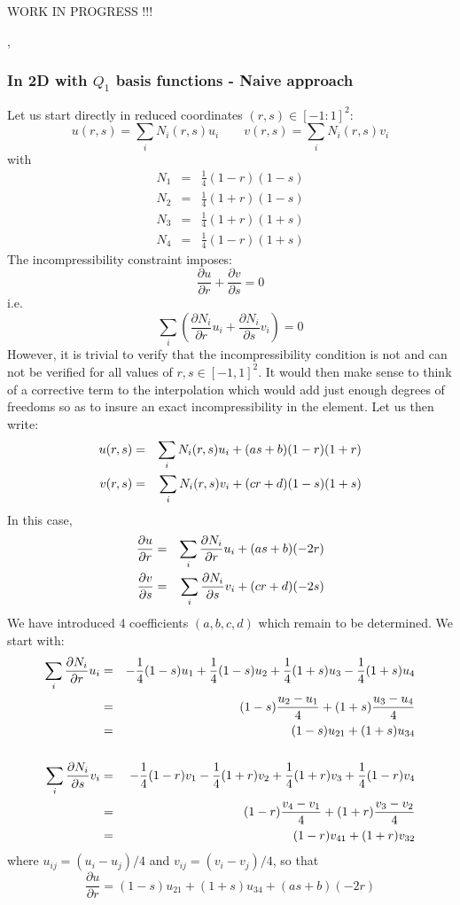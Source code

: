 
WORK IN PROGRESS !!!


\Literature \cite{pukp16},\cite{mcna11} \cite{waav15}

\subsubsection{In 2D with $Q_1$ basis functions - Naive approach}

Let us start directly in reduced coordinates $(r,s)\in [-1:1]^2$:
\[
u(r,s)=\sum_i N_i(r,s) u_i
\quad
\quad
v(r,s)=\sum_i N_i(r,s) v_i
\]
with 
\begin{eqnarray}
N_1&=& \frac{1}{4}(1-r)(1-s)  \nonumber\\ 
N_2&=& \frac{1}{4}(1+r)(1-s)  \nonumber\\ 
N_3&=& \frac{1}{4}(1+r)(1+s)  \nonumber\\ 
N_4&=& \frac{1}{4}(1-r)(1+s)  \nonumber
\end{eqnarray}
The incompressibility constraint imposes:
\[
\frac{\partial u}{\partial r}+
\frac{\partial v}{\partial s}=0
\]
i.e.
\[
\sum_i \left(  
\frac{\partial N_i}{\partial r} u_i+
\frac{\partial N_i}{\partial s} v_i
\right)
=0
\]
However, it is trivial to verify that the incompressibility 
condition is not and can not be verified for all values of  
$r,s \in [-1,1]^2$.
It would then make sense to think of a corrective term to the interpolation
which would add just enough degrees of freedoms so as to insure an exact
incompressibility in the element. 
Let us then write:
\begin{eqnarray}
u(r,s)&=&\sum_i N_i(r,s) u_i + (a s + b)(1-r)(1+r) \nonumber\\
v(r,s)&=&\sum_i N_i(r,s) v_i + (c r + d)(1-s)(1+s) \nonumber
\end{eqnarray}
In this case,
\begin{eqnarray}
\frac{\partial u}{\partial r}&=&\sum_i \frac{\partial N_i}{\partial r} u_i + (a s + b) (-2r) \nonumber\\
\frac{\partial v}{\partial s}&=&\sum_i \frac{\partial N_i}{\partial s} v_i + (c r + d)(-2s) \nonumber
\end{eqnarray}
We have introduced 4 coefficients  $(a,b,c,d)$ which remain to be determined. 
We start with:
\begin{eqnarray}
\sum_i \frac{\partial N_i}{\partial r} u_i 
&=& -\frac{1}{4} (1-s) u_1 + \frac{1}{4} (1-s) u_2 +\frac{1}{4} (1+s) u_3 -\frac{1}{4} (1+s) u_4 \nonumber\\
&=& (1-s) \frac{u_2-u_1}{4} + (1+s) \frac{u_3-u_4}{4} \nonumber\\
&=& (1-s) u_{21} + (1+s) u_{34} \nonumber\\
\nonumber\\
\sum_i \frac{\partial N_i}{\partial s} v_i 
&=& -\frac{1}{4} (1-r) v_1 - \frac{1}{4} (1+r) v_2 +\frac{1}{4} (1+r) v_3 +\frac{1}{4} (1-r) v_4 \nonumber\\
&=& (1-r) \frac{v_4-v_1}{4} + (1+r)\frac{v_3-v_2}{4} \nonumber\\
&=& (1-r) v_{41} + (1+r) v_{32} \nonumber
\end{eqnarray}
where $u_{ij}=(u_i-u_j)/4$ and $v_{ij}=(v_i-v_j)/4$, so that
\[
\frac{\partial u}{\partial r}=
(1-s) u_{21} + (1+s) u_{34} 
+ (a s + b) (-2r)
\]

